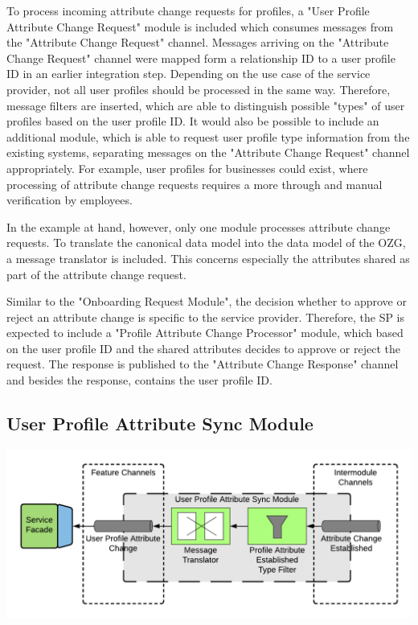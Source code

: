 To process incoming attribute change requests for profiles, a "User Profile Attribute Change Request" module is included which consumes messages from the "Attribute Change Request" channel. Messages arriving on the "Attribute Change Request" channel were mapped form a relationship ID to a user profile ID in an earlier integration step. Depending on the use case of the service provider, not all user profiles should be processed in the same way. Therefore, message filters are inserted, which are able to distinguish possible "types" of user profiles based on the user profile ID. It would also be possible to include an additional module, which is able to request user profile type information from the existing systems, separating messages on the "Attribute Change Request" channel appropriately. For example, user profiles for businesses could exist, where processing of attribute change requests requires a more through and manual verification by employees. 

In the example at hand, however, only one module processes attribute change requests. To translate the canonical data model into the data model of the OZG, a message translator is included. This concerns especially the attributes shared as part of the attribute change request.

Similar to the "Onboarding Request Module", the decision whether to approve or reject an attribute change is specific to the service provider. Therefore, the SP is expected to include a "Profile Attribute Change Processor" module, which based on the user profile ID and the shared attributes decides to approve or reject the request. The response is published to the "Attribute Change Response" channel and besides the response, contains the user profile ID.

\subsection{User Profile Attribute Sync Module}

\begin{center}
    \includegraphics[scale=0.6]{Diagrams/Integration Architecture 1/Technological Integration/13. User Profile Attribute Sync Module.pdf}
\end{center}


